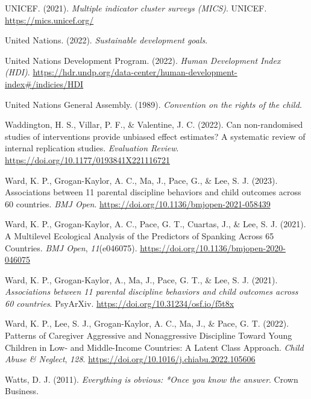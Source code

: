 \documentclass[
  letterpaper,
  DIV=11,
  numbers=noendperiod]{scrreprt}
\newlength{\cslhangindent}
\newenvironment{CSLReferences}[2] %
 {\begin{list}{}{%
  \setlength{\itemindent}{0pt}
  \setlength{\leftmargin}{0pt}
  \setlength{\parsep}{0pt}
  \ifodd #1
   \setlength{\leftmargin}{\cslhangindent}
   \setlength{\itemindent}{-1\cslhangindent}
  \fi
  \setlength{\itemsep}{#2\baselineskip}}}
 {\end{list}}
\begin{document}
\begin{CSLReferences}{1}{0}
UNICEF. (2021). \emph{Multiple indicator cluster surveys (MICS)}.
UNICEF. \url{https://mics.unicef.org/}

United Nations. (2022). \emph{Sustainable development goals}.

United Nations Development Program. (2022). \emph{{Human Development
Index (HDI)}}.
\url{https://hdr.undp.org/data-center/human-development-index\#/indicies/HDI}

United Nations General Assembly. (1989). \emph{Convention on the rights
of the child}.

Waddington, H. S., Villar, P. F., \& Valentine, J. C. (2022). Can
non-randomised studies of interventions provide unbiased effect
estimates? A systematic review of internal replication studies.
\emph{Evaluation Review}.
\url{https://doi.org/10.1177/0193841X221116721}

Ward, K. P., Grogan-Kaylor, A. C., Ma, J., Pace, G., \& Lee, S. J.
(2023). Associations between 11 parental discipline behaviors and child
outcomes across 60 countries. \emph{BMJ Open}.
\url{https://doi.org/10.1136/bmjopen-2021-058439}

Ward, K. P., Grogan-Kaylor, A. C., Pace, G. T., Cuartas, J., \& Lee, S.
J. (2021). {A Multilevel Ecological Analysis of the Predictors of
Spanking Across 65 Countries}. \emph{BMJ Open}, \emph{11}(e046075).
\url{https://doi.org/10.1136/bmjopen-2020-046075}

Ward, K. P., Grogan-Kaylor, A., Ma, J., Pace, G. T., \& Lee, S. J.
(2021). \emph{Associations between 11 parental discipline behaviors and
child outcomes across 60 countries}. PsyArXiv.
\url{https://doi.org/10.31234/osf.io/f5t8x}

Ward, K. P., Lee, S. J., Grogan-Kaylor, A. C., Ma, J., \& Pace, G. T.
(2022). {Patterns of Caregiver Aggressive and Nonaggressive Discipline
Toward Young Children in Low- and Middle-Income Countries: A Latent
Class Approach}. \emph{Child Abuse \& Neglect}, \emph{128}.
\url{https://doi.org/10.1016/j.chiabu.2022.105606}

Watts, D. J. (2011). \emph{Everything is obvious: *Once you know the
answer}. Crown Business.


\end{CSLReferences}
\end{document}
